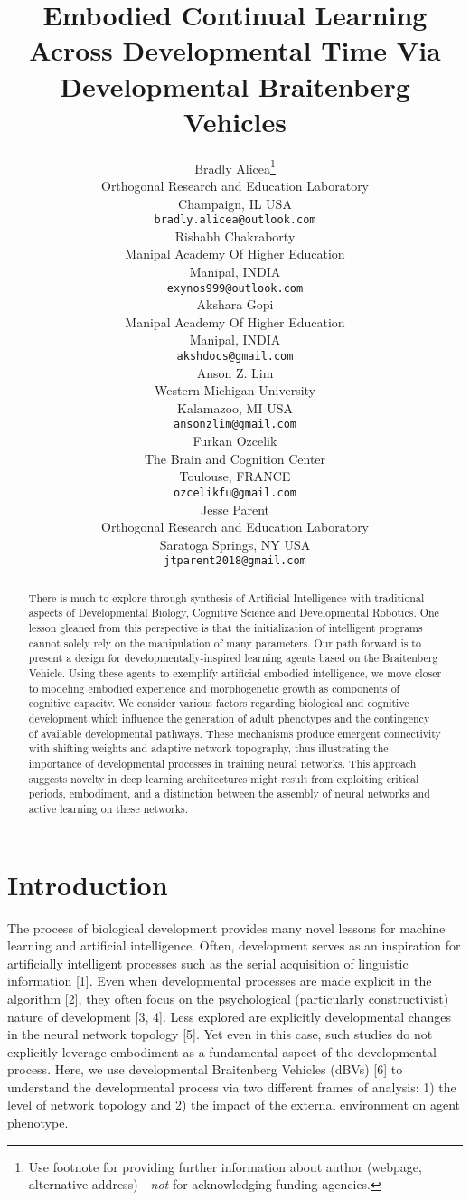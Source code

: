 \documentclass{article}
\title{Embodied Continual Learning Across Developmental Time Via 
Developmental Braitenberg Vehicles}
\author{%
  Bradly Alicea\thanks{Use footnote for providing further information
    about author (webpage, alternative address)---\emph{not} for acknowledging
    funding agencies.} \\
  Orthogonal Research and Education Laboratory\\
  Champaign, IL USA \\
  \texttt{bradly.alicea@outlook.com} \\
\And
  Rishabh Chakraborty \\
  Manipal Academy Of Higher Education \\
  Manipal, INDIA \\
   \texttt{exynos999@outlook.com} \\
\And
  Akshara Gopi \\
  Manipal Academy Of Higher Education \\
  Manipal, INDIA \\
   \texttt{akshdocs@gmail.com} \\
\And
  Anson Z. Lim \\
  Western Michigan University \\
  Kalamazoo, MI USA \\
   \texttt{ansonzlim@gmail.com} \\
\And
  Furkan Ozcelik \\
  The Brain and Cognition Center \\
  Toulouse, FRANCE \\
   \texttt{ozcelikfu@gmail.com} \\
\And
  Jesse Parent \\
  Orthogonal Research and Education Laboratory \\
  Saratoga Springs, NY USA \\
   \texttt{jtparent2018@gmail.com} \\
\AND

}
\begin{document}
\maketitle

\begin{abstract}
There is much to explore through synthesis of Artificial Intelligence with traditional aspects of Developmental Biology, Cognitive Science and Developmental Robotics. One lesson gleaned from this perspective is that the initialization of intelligent programs cannot solely rely on the manipulation of many parameters. Our path forward is to present a design for developmentally-inspired learning agents based on the Braitenberg Vehicle. Using these agents to exemplify artificial embodied intelligence, we move closer to modeling embodied experience and morphogenetic growth as components of cognitive capacity. We consider various factors regarding biological and cognitive development which influence the generation of  adult phenotypes and the contingency of available developmental pathways. These mechanisms produce emergent connectivity with shifting weights and adaptive network topography, thus illustrating the importance of developmental processes in training neural networks. This approach suggests novelty in deep learning architectures might result from exploiting critical periods, embodiment, and a distinction between the assembly of neural networks and active learning on these networks. 
\end{abstract}

\section{Introduction}

The process of biological development provides many novel lessons for machine learning and artificial intelligence. Often, development serves as an inspiration for artificially intelligent processes such as the serial acquisition of linguistic information [1]. Even when developmental processes are made explicit in the algorithm [2], they often focus on the psychological (particularly constructivist) nature of development [3, 4]. Less explored are explicitly developmental changes in the neural network topology [5]. Yet even in this case, such studies do not explicitly leverage embodiment as a fundamental aspect of the developmental process. Here, we use developmental Braitenberg Vehicles (dBVs) [6] to understand the developmental process via two different frames of analysis: 1) the level of network topology and 2) the impact of the external environment on agent phenotype. 
\end{document}
